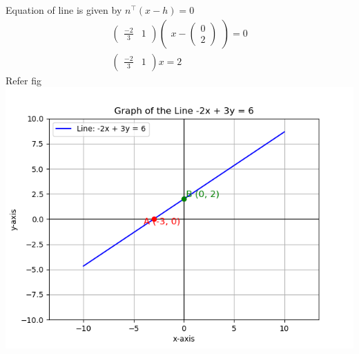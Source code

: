 \documentclass[journal]{IEEEtran}
\begin{document}
Equation \; of \;line \;is\; given by $n^\top(x-h)=0$
\begin{align}
\begin{pmatrix}
    \frac{-2}{3} & 1
\end{pmatrix}\begin{pmatrix}
    x - \begin{pmatrix}
        0 \\ 2
    \end{pmatrix}
\end{pmatrix}=0\\
\begin{pmatrix}
    \frac{-2}{3} & 1
\end{pmatrix}x=2
\end{align}
Refer fig
 \centering
\includegraphics[width=\columnwidth, height=0.8\textheight, keepaspectratio]{figs/Figure_6.png}     

 
\end{document}
